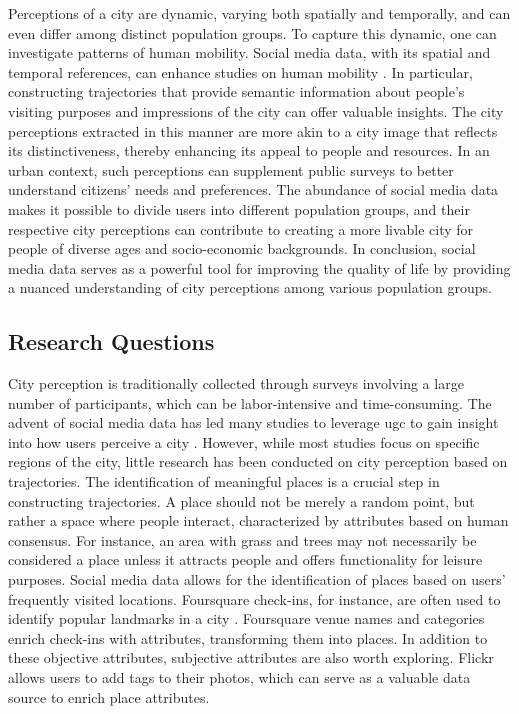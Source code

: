 \documentclass{article}
\theoremstyle{remark}
\begin{document}
Perceptions of a city are dynamic, varying both spatially and temporally, and can even differ among distinct population groups. To capture this dynamic, one can investigate patterns of human mobility. Social media data, with its spatial and temporal references, can enhance studies on human mobility \citep{beiro_predicting_2016}. In particular, constructing trajectories that provide semantic information about people's visiting purposes and impressions of the city can offer valuable insights. The city perceptions extracted in this manner are more akin to a city image that reflects its distinctiveness, thereby enhancing its appeal to people and resources. In an urban context, such perceptions can supplement public surveys to better understand citizens’ needs and preferences. The abundance of social media data makes it possible to divide users into different population groups, and their respective city perceptions can contribute to creating a more livable city for people of diverse ages and socio-economic backgrounds. In conclusion, social media data serves as a powerful tool for improving the quality of life by providing a nuanced understanding of city perceptions among various population groups.


\subsection{Research Questions} \label{rq}
City perception is traditionally collected through surveys involving a large number of participants, which can be labor-intensive and time-consuming. The advent of social media data has led many studies to leverage \acrshort{ugc} to gain insight into how users perceive a city \citep{cranshaw_livehoods_2021,huang_user_2022}. However, while most studies focus on specific regions of the city, little research has been conducted on city perception based on trajectories. The identification of meaningful places is a crucial step in constructing trajectories. A place should not be merely a random point, but rather a space where people interact, characterized by attributes based on human consensus. For instance, an area with grass and trees may not necessarily be considered a place unless it attracts people and offers functionality for leisure purposes. Social media data allows for the identification of places based on users’ frequently visited locations. Foursquare check-ins, for instance, are often used to identify popular landmarks in a city \citep{ferreira_beyond_2015,ferreira_uncovering_2020,santos_uncovering_2018}. Foursquare venue names and categories enrich check-ins with attributes, transforming them into places. In addition to these objective attributes, subjective attributes are also worth exploring. Flickr allows users to add tags to their photos, which can serve as a valuable data source to enrich place attributes.
\end{document}
